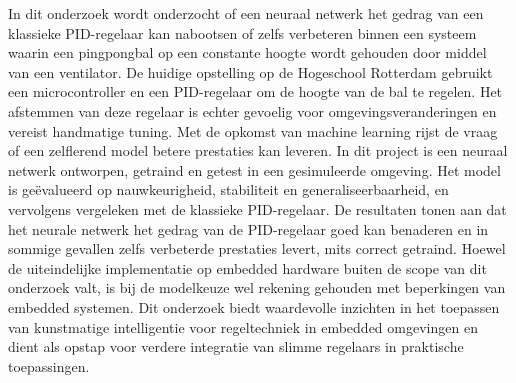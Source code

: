 In dit onderzoek wordt onderzocht of een neuraal netwerk het gedrag van een klassieke PID-regelaar kan nabootsen of zelfs verbeteren binnen een systeem waarin een pingpongbal op een constante hoogte wordt gehouden door middel van een ventilator. De huidige opstelling op de Hogeschool Rotterdam gebruikt een microcontroller en een PID-regelaar om de hoogte van de bal te regelen. Het afstemmen van deze regelaar is echter gevoelig voor omgevingsveranderingen en vereist handmatige tuning. Met de opkomst van machine learning rijst de vraag of een zelflerend model betere prestaties kan leveren. In dit project is een neuraal netwerk ontworpen, getraind en getest in een gesimuleerde omgeving. Het model is geëvalueerd op nauwkeurigheid, stabiliteit en generaliseerbaarheid, en vervolgens vergeleken met de klassieke PID-regelaar. De resultaten tonen aan dat het neurale netwerk het gedrag van de PID-regelaar goed kan benaderen en in sommige gevallen zelfs verbeterde prestaties levert, mits correct getraind. Hoewel de uiteindelijke implementatie op embedded hardware buiten de scope van dit onderzoek valt, is bij de modelkeuze wel rekening gehouden met beperkingen van embedded systemen. Dit onderzoek biedt waardevolle inzichten in het toepassen van kunstmatige intelligentie voor regeltechniek in embedded omgevingen en dient als opstap voor verdere integratie van slimme regelaars in praktische toepassingen.